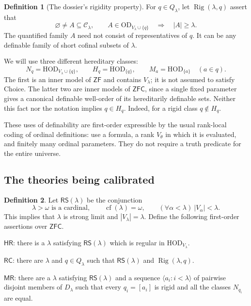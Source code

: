 \documentclass[11pt,letterpaper]{article}
\theoremstyle{definition}
\newtheorem{definition}{Definition}[section]
\numberwithin{equation}{section}
\newcommand{\ZFC}{\mathsf{ZFC}}
\newcommand{\ZF}{\mathsf{ZF}}
\newcommand{\HOD}{\mathrm{HOD}}
\newcommand{\OD}{\mathrm{OD}}
\newcommand{\cf}{\operatorname{cf}}
\newcommand{\Clam}{\mathcal C_\lambda}
\newcommand{\Rig}{\operatorname{Rig}}
\newcommand{\RS}{\mathsf{RS}}
\newcommand{\RC}{\mathsf{RC}}
\newcommand{\MR}{\mathsf{MR}}
\newcommand{\HR}{\mathsf{HR}}
\begin{document}
\begin{definition}[The dossier's rigidity property]\label{def:rig}
For $q\in Q_\lambda$, let $\Rig(\lambda,q)$ assert that
\[
 \varnothing\ne A\subseteq\Clam,\qquad
 A\in\OD_{V_\lambda\cup\{q\}}
 \quad\Longrightarrow\quad |A|\ge\lambda.
\]
The quantified family $A$ need not consist of representatives of $q$.
It can be any definable family of short cofinal subsets of $\lambda$.
\end{definition}

We will use three different hereditary classes:
\begin{equation}\label{eq:models}
 N_q=\HOD_{V_\lambda\cup\{q\}},\qquad
 H_q=\HOD_{\{q\}},\qquad
 M_a=\HOD_{\{a\}}\quad(a\in q).
\end{equation}
The first is an inner model of $\ZF$ and contains $V_\lambda$; it is not assumed
to satisfy Choice. The latter two are inner models of $\ZFC$, since a single
fixed parameter gives a canonical definable well-order of its hereditarily
definable sets. Neither this fact nor the notation implies $q\in H_q$.
Indeed, for a rigid class $q\notin H_q$.

These uses of definability are first-order expressible by the usual rank-local
coding of ordinal definitions: use a formula, a rank $V_\theta$ in which it is
evaluated, and finitely many ordinal parameters. They do not require a truth
predicate for the entire universe.

\subsection{The theories being calibrated}

\begin{definition}\label{def:theories}
Let $\RS(\lambda)$ be the conjunction
\[
 \lambda>\omega\text{ is a cardinal},\qquad
 \cf(\lambda)=\omega,\qquad
 (\forall\alpha<\lambda)\ |V_\alpha|<\lambda.
\]
This implies that $\lambda$ is strong limit and $|V_\lambda|=\lambda$.
Define the following first-order assertions over $\ZFC$.

$\HR$: there is a $\lambda$ satisfying $\RS(\lambda)$ which is regular in
$\HOD_{V_\lambda}$.

$\RC$: there are $\lambda$ and $q\in Q_\lambda$ such that
$\RS(\lambda)$ and $\Rig(\lambda,q)$.

$\MR$: there are a $\lambda$ satisfying $\RS(\lambda)$ and a sequence
$\langle a_i:i<\lambda\rangle$ of pairwise disjoint members of $D_\lambda$
such that every $q_i=[a_i]$ is rigid and all the classes $N_{q_i}$ are equal.
\end{definition}
\end{document}
